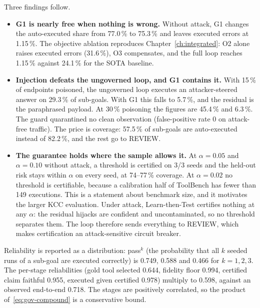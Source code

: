 

Three findings follow.
\begin{itemize}
  \item \textbf{G1 is nearly free when nothing is wrong.} Without attack, G1 changes the auto-executed
        share from 77.0\,\% to 75.3\,\% and leaves executed errors at 1.15\,\%. The objective ablation
        reproduces Chapter~\ref{ch:integrated}: O2 alone raises executed errors (31.6\,\%), O3
        compensates, and the full loop reaches 1.15\,\% against 24.1\,\% for the SOTA baseline.
  \item \textbf{Injection defeats the ungoverned loop, and G1 contains it.} With 15\,\% of endpoints
        poisoned, the ungoverned loop executes an attacker-steered answer on 29.3\,\% of sub-goals.
        With G1 this falls to 5.7\,\%, and the residual is the paraphrased payload. At 30\,\% poisoning
        the figures are 45.4\,\% and 6.3\,\%. The guard quarantined no clean observation
        (false-positive rate 0 on attack-free traffic). The price is coverage: 57.5\,\% of sub-goals are
        auto-executed instead of 82.2\,\%, and the rest go to REVIEW.
  \item \textbf{The guarantee holds where the sample allows it.} At $\alpha=0.05$ and $\alpha=0.10$
        without attack, a threshold is certified on 3/3 seeds and the held-out risk stays within
        $\alpha$ on every seed, at 74--77\,\% coverage. At $\alpha=0.02$ no threshold is certifiable,
        because a calibration half of ToolBench has fewer than 149 executions. This is a statement
        about benchmark size, and it motivates the larger KCC evaluation. Under attack,
        Learn-then-Test certifies nothing at any $\alpha$: the residual hijacks are confident and
        uncontaminated, so no threshold separates them. The loop therefore sends everything to
        REVIEW, which makes certification an attack-sensitive circuit breaker.
\end{itemize}
Reliability is reported as a distribution: pass$^k$ (the probability that all $k$ seeded runs of a
sub-goal are executed correctly) is 0.749, 0.588 and 0.466 for $k=1,2,3$. The per-stage reliabilities
(gold tool selected 0.644, fidelity floor 0.994, certified claim faithful 0.955, executed given
certified 0.978) multiply to 0.598, against an observed end-to-end 0.718. The stages are positively
correlated, so the product of~\eqref{eq:gov-compound} is a conservative bound.

